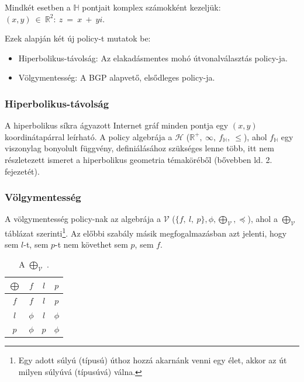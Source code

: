   Mindkét esetben a $\mathbb{H}$ pontjait komplex számokként kezeljük: $(x,y)~\in~\mathbb{R}^2:~z~=~x~+~yi$.

  Ezek alapján két új policy-t mutatok be:

  \begin{itemize}
    \item Hiperbolikus-távolság: Az elakadásmentes mohó útvonalválasztás policy-ja.
    \item Völgymentesség: A BGP alapvető, elsődleges policy-ja.
  \end{itemize}

      \subsubsection{Hiperbolikus-távolság}

      A hiperbolikus síkra ágyazott Internet gráf minden pontja egy $(x,y)$ koordinátapárral leírható. A policy algebrája a $\mathcal{H}$ ($\mathbb{R}^{+},~\infty,~f_{\mathbb{H}},~\leq$), ahol $f_{\mathbb{H}}$ egy viszonylag bonyolult függvény, definiálásához szükséges lenne több, itt nem részletezett ismeret a hiperbolikus geometria témaköréből (bővebben ld. \cite{Thurston97} 2. fejezetét).

      \subsubsection{Völgymentesség}

      A völgymentesség policy-nak az algebrája a $\mathcal{V}$ ($\{f,~l,~p\},\phi,\bigoplus_{\mathcal{V}},\preceq$), ahol a $\bigoplus_{\mathcal{V}}$  táblázat szerinti\footnote{ Egy adott súlyú (típusú) úthoz hozzá akarnánk venni egy élet, akkor az út milyen súlyúvá (típusúvá) válna.}. Az előbbi szabály másik megfogalmazásban azt jelenti, hogy sem $l$-t, sem $p$-t nem követhet sem $p$, sem $f$.

      \begin{table}[ht]
        \footnotesize
        \centering
        \caption{A $\bigoplus_{\mathcal{V}}$ \cite{Compact_Policy_Routing}.}
        \begin{tabular}{ c | c c c }
          $\bigoplus$ & $f$ & $l$ & $p$\\
          \hline
          $f$ & $f$ & $l$ & $p$\\
          $l$ & $\phi$ & $l$ & $\phi$\\
          $p$ & $\phi$ & $p$ & $\phi$\\
        \end{tabular}\label{tab:szumma_tab}
      \end{table}\newpage

